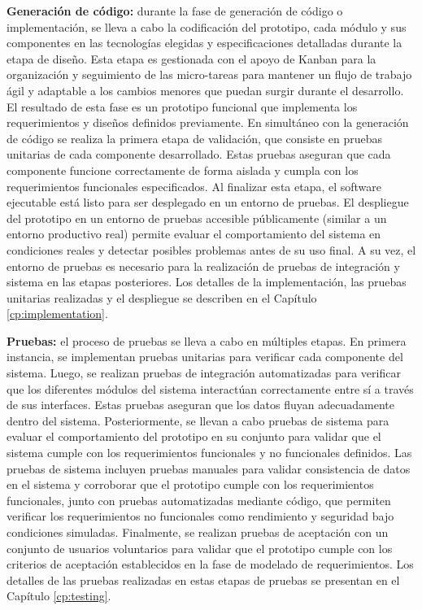 \textbf{Generación de código:}
durante la fase de generación de código o implementación, se lleva a cabo la codificación del prototipo, cada módulo y sus componentes en las tecnologías elegidas y especificaciones detalladas durante la etapa de diseño.
Esta etapa es gestionada con el apoyo de Kanban para la organización y seguimiento de las micro-tareas para mantener un flujo de trabajo ágil y adaptable a los cambios menores que puedan surgir durante el desarrollo.
El resultado de esta fase es un prototipo funcional que implementa los requerimientos y diseños definidos previamente.
En simultáneo con la generación de código se realiza la primera etapa de validación, que consiste en pruebas unitarias de cada componente desarrollado.
Estas pruebas aseguran que cada componente funcione correctamente de forma aislada y cumpla con los requerimientos funcionales especificados.
Al finalizar esta etapa, el software ejecutable está listo para ser desplegado en un entorno de pruebas. El despliegue del prototipo en un entorno de pruebas accesible públicamente (similar a un entorno productivo real) permite evaluar el comportamiento del sistema en condiciones reales y detectar posibles problemas antes de su uso final. A su vez, el entorno de pruebas es necesario para la realización de pruebas de integración y sistema en las etapas posteriores.
Los detalles de la implementación, las pruebas unitarias realizadas y el despliegue se describen en el Capítulo \ref{cp:implementation}.

\textbf{Pruebas:}
el proceso de pruebas se lleva a cabo en múltiples etapas.
En primera instancia, se implementan pruebas unitarias para verificar cada componente del sistema. Luego, se realizan pruebas de integración automatizadas para verificar que los diferentes módulos del sistema interactúan correctamente entre sí a través de sus interfaces.
Estas pruebas aseguran que los datos fluyan adecuadamente dentro del sistema.
Posteriormente, se llevan a cabo pruebas de sistema para evaluar el comportamiento del prototipo en su conjunto para validar que el sistema cumple con los requerimientos funcionales y no funcionales definidos.
Las pruebas de sistema incluyen pruebas manuales para validar consistencia de datos en el sistema y corroborar que el prototipo cumple con los requerimientos funcionales, junto con pruebas automatizadas mediante código, que permiten verificar los requerimientos no funcionales como rendimiento y seguridad bajo condiciones simuladas.
Finalmente, se realizan pruebas de aceptación con un conjunto de usuarios voluntarios para validar que el prototipo cumple con los criterios de aceptación establecidos en la fase de modelado de requerimientos.
Los detalles de las pruebas realizadas en estas etapas de pruebas se presentan en el Capítulo \ref{cp:testing}.

